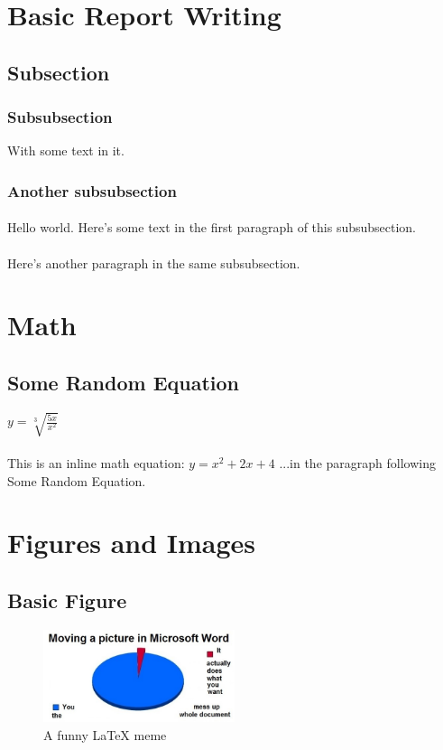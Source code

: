 \documentclass{article}
\begin{document}
\section{Basic Report Writing}
\subsection{Subsection}
\subsubsection{Subsubsection}
With some text in it.
\subsubsection{Another subsubsection}
\paragraph{}
Hello world. Here's some text in the first paragraph of this subsubsection.
\paragraph{}
Here's another paragraph in the same subsubsection. 


\section{Math}
\subsection{Some Random Equation}
$y = \sqrt[3]{\frac{5x}{x^2}}$

\paragraph{}
This is an inline math equation: $y = x^2 + 2x + 4$ ...in the paragraph following Some Random Equation.


\section{Figures and Images}
\subsection{Basic Figure}
\begin{figure}[h]
\caption{A funny LaTeX meme}
\centering
\includegraphics[width=0.5\textwidth]{latex-meme.jpg}
\end{figure}
\end{document}
